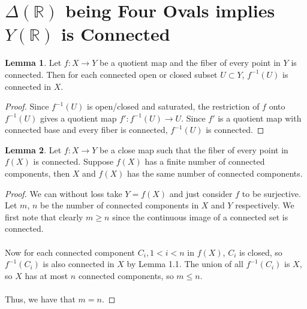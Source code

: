 \documentclass{article}
\newcommand{\Rbb}{\mathbb{R}}
\begin{document}
\theoremstyle{definition}
\newtheorem{theorem}{Theorem}[section]
\theoremstyle{definition}
\newtheorem{conjecture}[theorem]{Conjecture}
\theoremstyle{definition}
\newtheorem{definition}[theorem]{Definition}
\theoremstyle{definition}
\newtheorem{goal}[theorem]{Goal}
\theoremstyle{definition}
\newtheorem{corollary}[theorem]{Corollary}
\theoremstyle{definition}
\newtheorem{question}[theorem]{Question}
\theoremstyle{definition}
\newtheorem{lemma}[theorem]{Lemma}
\theoremstyle{definition}
\newtheorem{proposition}[theorem]{Proposition}

\section{$\Delta(\Rbb)$ being Four Ovals implies $Y(\Rbb)$ is Connected}

\begin{lemma}
Let $f: X \to Y$ be a quotient map and the fiber of every point in $Y$ is connected. Then for each connected open or closed subset $U \subset Y$, $f^{-1}(U)$ is connected in $X$.
\end{lemma}

\begin{proof}
Since $f^{-1}(U)$ is open/closed and saturated, the restriction of $f$ onto $f^{-1}(U)$ gives a quotient map $f': f^{-1}(U) \to U$. Since $f'$ is a quotient map with connected base and every fiber is connected, $f^{-1}(U)$ is connected.
\end{proof}

\begin{lemma}
Let $f: X \to Y$ be a close map such that the fiber of every point in $f(X)$ is connected. Suppose $f(X)$ has a finite number of connected components, then $X$ and $f(X)$ has the same number of connected components.
\end{lemma}

\begin{proof}
We can without loss take $Y = f(X)$ and just consider $f$ to be surjective. Let $m$, $n$ be the number of connected components in $X$ and $Y$ respectively. We first note that clearly $m \geq n$ since the continuous image of a connected set is connected.\\\\
Now for each connected component $C_i, 1 < i < n$ in $f(X)$, $C_i$ is closed, so $f^{-1}(C_i)$ is also connected in $X$ by Lemma 1.1. The union of all $f^{-1}(C_i)$ is $X$, so $X$ has at most $n$ connected components, so $m \leq n$.\\\\
Thus, we have that $m = n$.
\end{proof}
\end{document}
